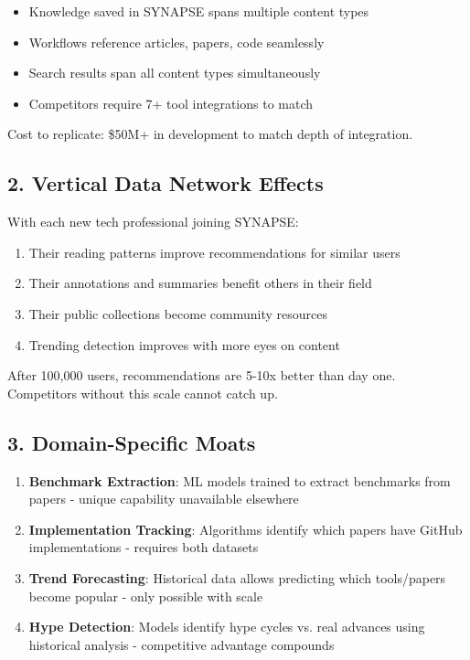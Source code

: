\documentclass{report}
\begin{document}
\begin{itemize}
    \item Knowledge saved in SYNAPSE spans multiple content types
    \item Workflows reference articles, papers, code seamlessly
    \item Search results span all content types simultaneously
    \item Competitors require 7+ tool integrations to match
\end{itemize}

Cost to replicate: \$50M+ in development to match depth of integration.

\subsection{2. Vertical Data Network Effects}

With each new tech professional joining SYNAPSE:

\begin{enumerate}
    \item Their reading patterns improve recommendations for similar users
    \item Their annotations and summaries benefit others in their field
    \item Their public collections become community resources
    \item Trending detection improves with more eyes on content
\end{enumerate}

After 100,000 users, recommendations are 5-10x better than day one. Competitors without this scale cannot catch up.

\subsection{3. Domain-Specific Moats}

\begin{enumerate}
    \item \textbf{Benchmark Extraction}: ML models trained to extract benchmarks from papers - unique capability unavailable elsewhere
    \item \textbf{Implementation Tracking}: Algorithms identify which papers have GitHub implementations - requires both datasets
    \item \textbf{Trend Forecasting}: Historical data allows predicting which tools/papers become popular - only possible with scale
    \item \textbf{Hype Detection}: Models identify hype cycles vs. real advances using historical analysis - competitive advantage compounds
\end{enumerate}
\end{document}

